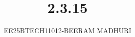 \documentclass[journal]{IEEEtran}
\begin{document}

\vspace{3cm}

\title{2.3.15}
\author{EE25BTECH11012-BEERAM MADHURI}
{\let\newpage\relax\maketitle}

\renewcommand{\thefigure}{\theenumi}
\renewcommand{\thetable}{\theenumi}
\setlength{\intextsep}{10pt} %


\renewcommand{\thetable}{\theenumi}
\end{document}
